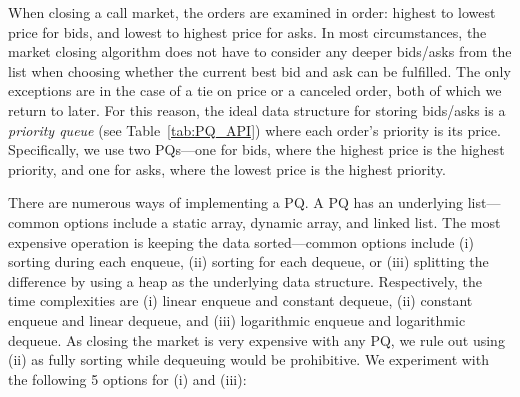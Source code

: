 When closing a call market, the orders are examined in order: highest to lowest price for bids, and lowest to highest price for asks. In most circumstances, the market closing algorithm does not have to consider any deeper bids/asks from the list when choosing whether the current best bid and ask can be fulfilled. The only exceptions are in the case of a tie on price or a canceled order, both of which we return to later. For this reason, the ideal data structure for storing bids/asks is a \textit{priority queue} (see Table~\ref{tab:PQ_API}) where each order's priority is its price. Specifically, we use two PQs---one for bids, where the highest price is the highest priority, and one for asks, where the lowest price is the highest priority. 

There are numerous ways of implementing a PQ. A PQ has an underlying list---common options include a static array, dynamic array, and linked list. The most expensive operation is keeping the data sorted---common options include (i) sorting during each enqueue, (ii) sorting for each dequeue, or (iii) splitting the difference by using a heap as the underlying data structure. Respectively, the time complexities are (i) linear enqueue and constant dequeue, (ii) constant enqueue and linear dequeue, and (iii) logarithmic enqueue and logarithmic dequeue. As closing the market is very expensive with any PQ, we rule out using (ii) as fully sorting while dequeuing would be prohibitive. We experiment with the following 5 options for (i) and (iii):


